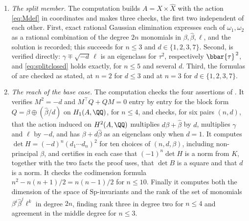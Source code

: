 \begin{enumerate}[label=\textup{(\Roman*)},leftmargin=*]
\item \emph{The split member.} The computation builds
  $A=X\times\widehat{X}$ with the action \eqref{eq:Mdef} in coordinates and
  makes three checks, the first two independent of each other. First, exact
  rational Gaussian elimination expresses each of $\omega_{1},\omega_{2}$ as
  a rational combination of the degree $2n$ monomials in
  $\beta,\widehat{\beta},\ell$, and the solution is recorded; this succeeds
  for $n\le3$ and $d\in\{1,2,3,7\}$. Second,  is
  verified directly: $\gamma\mp\sqrt{-d}\,\ell$ is an eigenclass for
  $\tau^{2}$, respectively $\bbar{\tau}^{\,2}$, and \eqref{eq:splitclosed}
  holds exactly, for $n\le5$ and several $d$. Third, the formulas of
   are checked as stated, at $n=2$ for $d\le3$ and at
  $n=3$ for $d\in\{1,2,3,7\}$.

\item \emph{The reach of the base case.} The computation checks the four
  assertions of . It verifies $M^{2}=-d$ and
  $M^{\top}Q+QM=0$ entry by entry for the block form
  $Q=\beta\oplus(\widehat\beta/d)$ on $H_{1}(A,\QQ)$, for $n\le4$, and checks,
  for six pairs $(n,d)$, that the action induced on $H^{2}(A,\QQ)$ multiplies
  $d\beta+\widehat\beta$ by $d$, multiplies $\gamma$ and $\ell$ by $-d$, and
  has $\beta+d\widehat\beta$ as an eigenclass only when $d=1$. It computes
  $\det H=(-d)^{n}(d_{1}\cdots d_{n})^{2}$ for ten choices of $(n,d,\beta)$,
  including non-principal $\beta$, and certifies in each case that
  $(-1)^{n}\det H$ is a norm from $K$, together with the two facts the proof
  uses, that $\det B$ is a square and that $d$ is a norm. It checks the
  codimension formula $n^{2}-n(n+1)/2=n(n-1)/2$ for $n\le10$. Finally it
  computes both the dimension of the space of $\mathrm{Sp}$-invariants and
  the rank of the set of monomials $\beta^{i}\widehat{\beta}^{j}\ell^{k}$ in
  degree $2n$, finding rank three in degree two for $n\le4$ and agreement in
  the middle degree for $n\le3$.


\end{enumerate}
